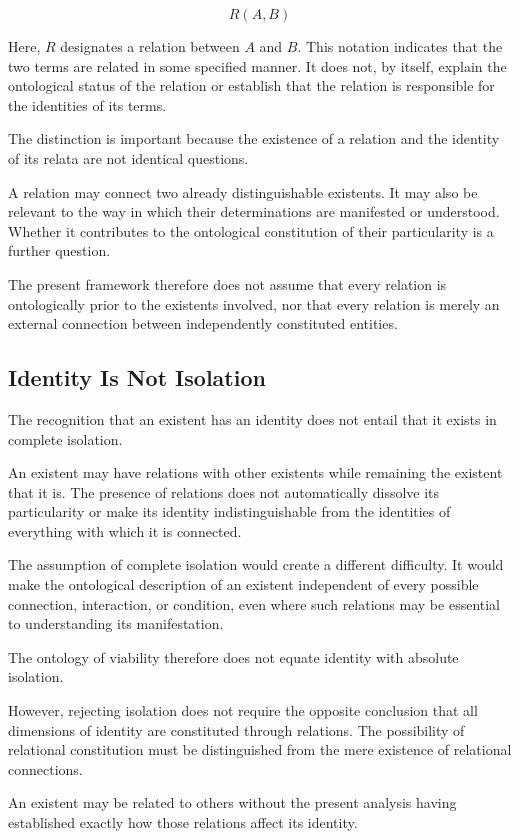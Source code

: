 \[
R(A,B)
\]

Here, \(R\) designates a relation between \(A\) and \(B\). This notation indicates that the two terms are related in some specified manner. It does not, by itself, explain the ontological status of the relation or establish that the relation is responsible for the identities of its terms.

The distinction is important because the existence of a relation and the identity of its relata are not identical questions.

A relation may connect two already distinguishable existents. It may also be relevant to the way in which their determinations are manifested or understood. Whether it contributes to the ontological constitution of their particularity is a further question.

The present framework therefore does not assume that every relation is ontologically prior to the existents involved, nor that every relation is merely an external connection between independently constituted entities.

\subsection{Identity Is Not Isolation}

The recognition that an existent has an identity does not entail that it exists in complete isolation.

An existent may have relations with other existents while remaining the existent that it is. The presence of relations does not automatically dissolve its particularity or make its identity indistinguishable from the identities of everything with which it is connected.

The assumption of complete isolation would create a different difficulty. It would make the ontological description of an existent independent of every possible connection, interaction, or condition, even where such relations may be essential to understanding its manifestation.

The ontology of viability therefore does not equate identity with absolute isolation.

However, rejecting isolation does not require the opposite conclusion that all dimensions of identity are constituted through relations. The possibility of relational constitution must be distinguished from the mere existence of relational connections.

An existent may be related to others without the present analysis having established exactly how those relations affect its identity.


